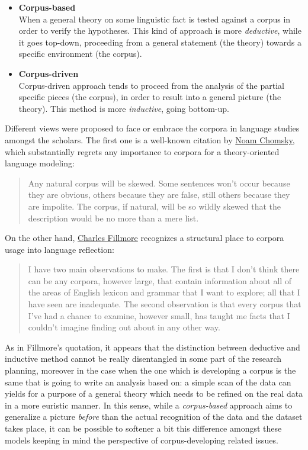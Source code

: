 \documentclass[
  a4paper,
  twoside,
  12pt,
  chapterprefix=false,
  bibliography=totocnumbered,
  listof=flat]{scrbook}
\begin{document}
\begin{itemize}
\item
  \textbf{Corpus-based}\\
  When a general theory on some linguistic fact is tested against a corpus in order to verify the hypotheses.
  This kind of approach is more \emph{deductive}, while it goes top-down, proceeding from a general statement (the theory) towards a specific environment (the corpus).
\item
  \textbf{Corpus-driven}\\
  Corpus-driven approach tends to proceed from the analysis of the partial specific pieces (the corpus), in order to result into a general picture (the theory).
  This method is more \emph{inductive}, going bottom-up.
\end{itemize}

Different views were proposed to face or embrace the corpora in language studies amongst the scholars. The first one is a well-known citation by \href{https://en.wikipedia.org/wiki/Noam_Chomsky}{Noam Chomsky}, which substantially regrets any importance to corpora for a theory-oriented language modeling:

\begin{quote}
Any natural corpus will be skewed.
Some sentences won't occur because they are obvious, others because they are false, still others because they are impolite.
The corpus, if natural, will be so wildly skewed that the description would be no more than a mere list.
\citep[Chomsky 1962, \emph{A transformational approach to syntax} in][]{togninibonelli2001}
\end{quote}

On the other hand, \href{https://en.wikipedia.org/wiki/Charles_J._Fillmore}{Charles Fillmore} recognizes a structural place to corpora usage into language reflection:

\begin{quote}
I have two main observations to make. The first is that I don't think there can be any corpora, however large, that contain information about all of the areas of English lexicon and grammar that I want to explore; all that I have seen are inadequate. The second observation is that every corpus that I've had a chance to examine, however small, has taught me facts that I couldn't imagine finding out about in any other way.
\citep{fillmore1992}
\end{quote}

As in Fillmore's quotation, it appears that the distinction between deductive and inductive method cannot be really disentangled in some part of the research planning, moreover in the case when the one which is developing a corpus is the same that is going to write an analysis based on: a simple scan of the data can yields for a purpose of a general theory which needs to be refined on the real data in a more euristic manner.
In this sense, while a \emph{corpus-based} approach aims to generalize a picture \emph{before} than the actual recognition of the data and the dataset takes place, it can be possible to softener a bit this difference amongst these models keeping in mind the perspective of corpus-developing related issues.
\end{document}
